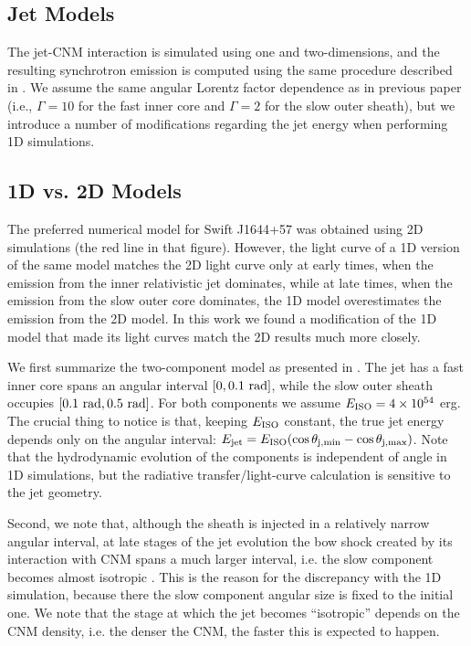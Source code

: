 \documentclass[usenatbib,fleqn]{mnras}
\begin{document}
\subsection{Jet Models}
\label{sec:numerical}

The jet-CNM interaction is simulated using one and two-dimensions, and
the resulting synchrotron emission is computed using the same
procedure described in \citet{Mimica+2015}. We assume the same angular
Lorentz factor dependence as in previous paper (i.e., $\Gamma = 10$
for the fast inner core and $\Gamma = 2$ for the slow outer sheath),
but we introduce a number of modifications regarding the jet energy
when performing 1D simulations.

\subsection{1D vs. 2D Models}
\label{sec:2d}

The preferred numerical model for Swift J1644+57 \citep[Fig.10
in][]{Mimica+2015} was obtained using 2D simulations (the red line in
that figure). However, the light curve of a 1D version of the same
model \citep[black line in Fig. 10 in][see also section 4.2 of that
paper]{Mimica+2015} matches the 2D light curve only at early times,
when the emission from the inner relativistic jet dominates, while at
late times, when the emission from the slow outer core dominates, the
1D model overestimates the emission from the 2D model. In this work we
found a modification of the 1D model that made its light curves
match the 2D results much more closely.

We first summarize the two-component model as presented in
\citet{Mimica+2015}. The jet has a fast inner core spans an
angular interval $[0, 0.1\ {\rm rad}]$, while the slow outer sheath
occupies $[0.1\ {\rm rad}, 0.5\ {\rm rad}]$. For both components we
assume $E_{\rm ISO} = 4\times 10^{54}$ erg. The crucial thing to
notice is that, keeping $E_{\rm ISO}$ constant, the true jet energy
depends only on the angular interval: $E_{\rm jet} = E_{\rm ISO}
(\cos\theta_{\rm j,min} - \cos\theta_{\rm j,max})$. Note that the
hydrodynamic evolution of the components is independent of angle in 1D
simulations, but the radiative transfer/light-curve calculation is
sensitive to the jet geometry.

Second, we note that, although the sheath is injected in a relatively
narrow angular interval, at late stages of the jet evolution the bow
shock created by its interaction with CNM spans a much larger interval,
i.e. the slow component becomes almost isotropic \citep[bottom two
panels in Fig. 8 in][]{Mimica+2015}. This is the reason for the
discrepancy with the 1D simulation, because there the slow component
angular size is fixed to the initial one. We note that the stage at
which the jet becomes ``isotropic'' depends on the CNM density,
i.e. the denser the CNM, the faster this is expected to happen.
\end{document}
